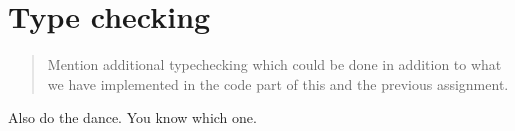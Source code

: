 \section{Type checking}
\begin{quote}
Mention additional typechecking which could be done in addition to what we have implemented in the code part of this and the previous assignment.
\end{quote}

Also do the dance. You know which one.
